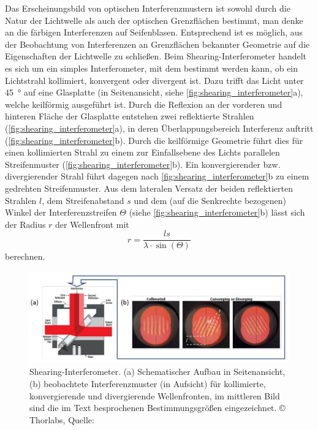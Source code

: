 \documentclass[ngerman]{scrartcl}
\begin{document}
Das Erscheinungsbild von optischen Interferenzmustern ist sowohl durch die Natur der Lichtwelle als auch der optischen Grenzflächen bestimmt, man denke an die färbigen Interferenzen auf Seifenblasen. Entsprechend ist es möglich, aus der Beobachtung von Interferenzen an Grenzflächen bekannter Geometrie auf die Eigenschaften der Lichtwelle zu schließen.
Beim Shearing-Interferometer handelt es sich um ein simples Interferometer, mit dem bestimmt werden kann, ob ein Lichtstrahl kollimiert, konvergent oder divergent ist. Dazu trifft das Licht unter \SI{45}{\degree} auf eine Glasplatte (in Seitenansicht, siehe \autoref{fig:shearing_interferometer}a), welche keilförmig ausgeführt ist. Durch die Reflexion an der vorderen und hinteren Fläche der Glasplatte entstehen zwei reflektierte Strahlen (\autoref{fig:shearing_interferometer}a), in deren Überlappungsbereich Interferenz auftritt (\autoref{fig:shearing_interferometer}b). Durch die keilförmige Geometrie führt dies für einen kollimierten Strahl zu einem zur Einfallsebene des Lichts parallelen Streifenmuster (\autoref{fig:shearing_interferometer}b). Ein konvergierender bzw. divergierender Strahl führt dagegen nach \autoref{fig:shearing_interferometer}b zu einem gedrehten Streifenmuster. Aus dem lateralen Versatz der beiden reflektierten Strahlen $l$, dem Streifenabstand $s$ und dem (auf die Senkrechte bezogenen) Winkel der Interferenzstreifen $\Theta$ (siehe \autoref{fig:shearing_interferometer}b) lässt sich der Radius $r$ der Wellenfront mit
\[r = \frac{ls}{\lambda \cdot \sin(\Theta)}\]
berechnen.

\begin{figure}[H]
    \centering
    \begin{samepage}
        \includegraphics[width=0.8\linewidth]{fig/Angabe_Abb5.png}
        \caption[Shearing-Interferometer]{Shearing-Interferometer. (a) Schematischer Aufbau in Seitenansicht, (b) beobachtete
            Interferenzmuster (in Aufsicht) für kollimierte, konvergierende und divergierende Wellenfronten, im
            mittleren Bild sind die im Text besprochenen Bestimmungsgrößen eingezeichnet. \copyright{} Thorlabs, Quelle: \cite{ref:angabe}}
        \label{fig:shearing_interferometer}
    \end{samepage}
\end{figure}
\end{document}

